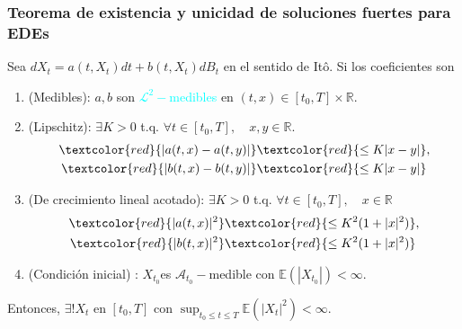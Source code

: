 \begin{frame}
  \frametitle{Teorema de existencia y unicidad de soluciones fuertes para EDEs}
	\hypertarget{thm:ExistenciaUnicidadEDE}{}  
	\vspace{-.50cm}  
  Sea $dX_{t}=a(t,X_{t})dt+b(t,X_{t})dB_{t}$ en el sentido de It\^{o}. Si los coeficientes son
	\vspace{-.23cm}  
	\begin{block}{}
	\begin{enumerate}[(EU1)]
	  \item (Medibles):
		$a,b$ son \textcolor{cyan}{$\mathcal{L}^{2}-$medibles} en
		$(t,x)\in[t_{0},T]\times\mathbb{R}$.
	 \item (Lipschitz): $\exists K>0$  t.q. $\forall t\in[t_{0},T],\quad x,y\in\mathbb{R}.$
			\begin{align*}
				\textcolor{red}{
				|a(t,x)-a(t,y)|}&\textcolor{red}{\leq K|x-y|}, \\
				\textcolor{red}{|b(t,x)-b(t,y)|}&\textcolor{red}{\leq K|x-y|}
			\end{align*}				
	\item (De crecimiento lineal acotado):
		$\exists K>0$ t.q. $\forall t\in[t_{0},T],\quad x\in\mathbb{R}$
		\begin{align*}
			\textcolor{red}{|a(t,x)|^{2}}&\textcolor{red}{\leq K^{2}(1+|x|^{2})},\\
			\textcolor{red}{|b(t,x)|^{2}}&\textcolor{red}{\leq K^{2}(1+|x|^{2})} 		
		\end{align*}				
	  \item (Condición inicial) : $X_{t_{0}}$es $\mathcal{A}_{t_{0}}-$medible
		con $\mathbb{E}(|X_{t_{0}}|)<\infty$.
	  \end{enumerate}
		Entonces, \colorbox{darkyellow}{$ \exists ! X_{t}$} en
		$[t_{0},T]$ con  \colorbox{darkyellow}{
			$\displaystyle
				 \sup_{t_{0}\leq t\leq T}
				 \mathbb{E}(|X_{t}|^{2})<\infty$.
				 }
	\end{block}
	\hyperlink{thm:ConsistenciaConvergencia}{}
\end{frame}
